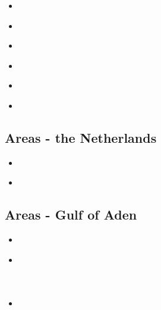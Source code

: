 \begin{scriptsize}
\begin{itemize}
\item[\nineteenninetyeight] 
\textcite{buwg98} \\
\item[\twothousandseven] 
\textcite{shpy07} \\
\item[\twothousandnine] 
\textcite{rohu09} \\
\item[\twothousandfourteen] 
\textcite{fabm14} \\
\item[\twothousandfifteen] 
\textcite{vami15} \\
\item[\twothousandtwenty] 
\textcite{dadm20} \\
\end{itemize}
\end{scriptsize}

\subsection{Areas - the Netherlands}

\begin{scriptsize}
\begin{itemize}
\item[\twothousandtwo]  
\textcite{crdv02} \\
\item[\twothousandtwenty]  
\textcite{besb20} \\
\end{itemize}
\end{scriptsize}

\subsection{Areas - Gulf of Aden}

\begin{scriptsize}
\begin{itemize}
\item[\twothousandthree] 
\textcite{hukm03} \\
\item[\twothousandthirteen] 
\textcite{beha13} \\
\textcite{brau13} \\
\textcite{wabd13} \\
\item[\twothousandtwenty] 
\textcite{duhm20} \\
\end{itemize}
\end{scriptsize}

